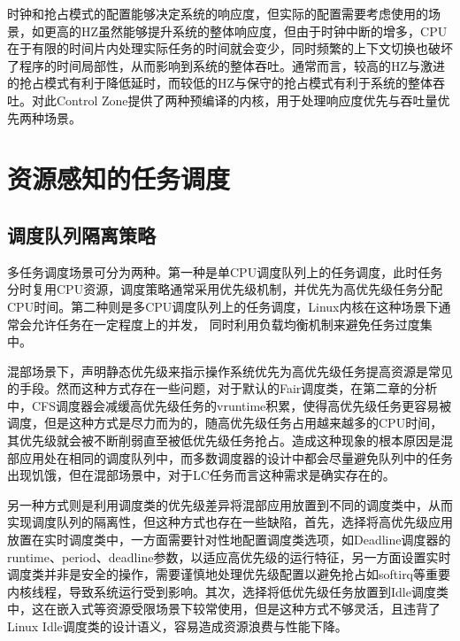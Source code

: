时钟和抢占模式的配置能够决定系统的响应度，但实际的配置需要考虑使用的场景，如更高的HZ虽然能够提升系统的整体响应度，但由于时钟中断的增多，CPU在于有限的时间片内处理实际任务的时间就会变少，同时频繁的上下文切换也破坏了程序的时间局部性，从而影响到系统的整体吞吐。通常而言，较高的HZ与激进的抢占模式有利于降低延时，而较低的HZ与保守的抢占模式有利于系统的整体吞吐。对此Control Zone提供了两种预编译的内核，用于处理响应度优先与吞吐量优先两种场景。

\section{资源感知的任务调度}


\subsection{调度队列隔离策略}


多任务调度场景可分为两种。第一种是单CPU调度队列上的任务调度，此时任务分时复用CPU资源，调度策略通常采用优先级机制，并优先为高优先级任务分配CPU时间。第二种则是多CPU调度队列上的任务调度，Linux内核在这种场景下通常会允许任务在一定程度上的并发， 同时利用负载均衡机制来避免任务过度集中。

混部场景下，声明静态优先级来指示操作系统优先为高优先级任务提高资源是常见的手段。然而这种方式存在一些问题，对于默认的Fair调度类，在第二章的分析中，CFS调度器会减缓高优先级任务的vruntime积累，使得高优先级任务更容易被调度，但是这种方式是尽力而为的，随高优先级任务占用越来越多的CPU时间，其优先级就会被不断削弱直至被低优先级任务抢占。造成这种现象的根本原因是混部应用处在相同的调度队列中，而多数调度器的设计中都会尽量避免队列中的任务出现饥饿，但在混部场景中，对于LC任务而言这种需求是确实存在的。

另一种方式则是利用调度类的优先级差异将混部应用放置到不同的调度类中，从而实现调度队列的隔离性，但这种方式也存在一些缺陷，首先，选择将高优先级应用放置在实时调度类中，一方面需要针对性地配置调度类选项，如Deadline调度器的runtime、period、deadline参数，以适应高优先级的运行特征，另一方面设置实时调度类并非是安全的操作，需要谨慎地处理优先级配置以避免抢占如softirq等重要内核线程，导致系统运行受到影响。其次，选择将低优先级任务放置到Idle调度类中，这在嵌入式等资源受限场景下较常使用，但是这种方式不够灵活，且违背了Linux Idle调度类的设计语义，容易造成资源浪费与性能下降。

